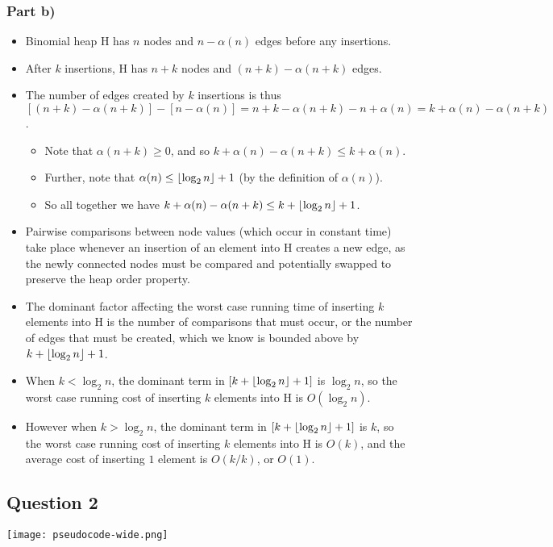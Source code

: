 \documentclass[11pt]{article}
\DeclarePairedDelimiter\floor{\lfloor}{\rfloor}
\begin{document}
\subsubsection*{Part b)}
\begin{itemize}
\item Binomial heap H has $n$ nodes and $n-\alpha(n)$ edges before any insertions.
\item After $k$ insertions, H has $n+k$ nodes and $(n+k)-\alpha(n+k)$ edges.
\item The number of edges created by $k$ insertions is thus $[(n+k)-\alpha(n+k)] - [n-\alpha(n)] = n+k-\alpha(n+k)-n+\alpha(n) = k + \alpha(n) - \alpha(n+k)$.
	\begin{itemize}
	\item Note that $\alpha(n+k)\geq 0$, and so $k + \alpha(n) - \alpha(n+k) \leq k + \alpha(n)$.
	\item Further, note that $\alpha(n) \leq \floor{\log_{2}{n}}+1$ (by the definition of $\alpha(n)$).
	\item So all together we have $k + \alpha(n) - \alpha(n+k) \leq k+ \floor{\log_{2}{n}}+1$.
	
	\end{itemize}
\item Pairwise comparisons between node values (which occur in constant time) take place whenever an insertion of an element into H creates a new edge, as the newly connected nodes must be compared and potentially swapped to preserve the heap order property. 
\item The dominant factor affecting the worst case running time of inserting $k$ elements into H is the number of comparisons that must occur, or the number of edges that must be created, which we know is bounded above by $k+ \floor{\log_{2}{n}}+1$.
\item When $k<\log_{2}{n}$, the dominant term in $[k+ \floor{\log_{2}{n}}+1]$ is $\log_{2}{n}$, so the worst case running cost of inserting $k$ elements into H is $O(\log_{2}{n})$.
\item However when $k>\log_{2}{n}$, the dominant term in $[k+ \floor{\log_{2}{n}}+1]$ is $k$, so the worst case running cost of inserting $k$ elements into H is $O(k)$, and the average cost of inserting $1$ element is $O(k/k)$, or $O(1)$.
\end{itemize}

\subsection*{Question 2}
\begin{center}
\texttt{[image: pseudocode-wide.png]}
\end{center}
\end{document}
